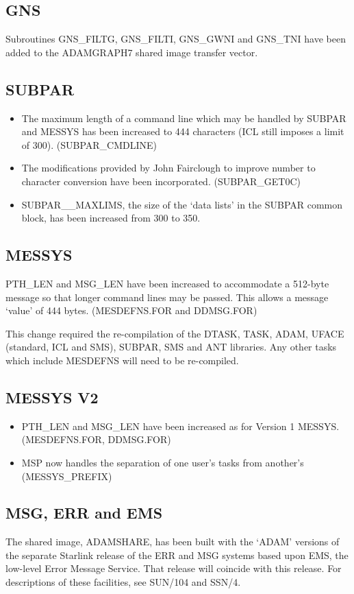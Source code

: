 \subsection{GNS}
Subroutines GNS\_FILTG, GNS\_FILTI, GNS\_GWNI and GNS\_TNI have been added to
the ADAMGRAPH7 shared image transfer vector.

\subsection{SUBPAR}
\begin{itemize}
\item The maximum length of a command line which may be handled by SUBPAR 
and MESSYS has been increased to 444 characters (ICL still imposes a limit 
of 300).
(SUBPAR\_CMDLINE)
\item The modifications provided by John Fairclough to improve number to 
character conversion have been incorporated.
(SUBPAR\_GET0C)
\item SUBPAR\_\_MAXLIMS, the size of the `data lists' in the SUBPAR common
block, has been increased from 300 to 350.
\end{itemize}

\subsection{MESSYS}
PTH\_LEN and MSG\_LEN have been increased to  accommodate a 512-byte message
so that longer command lines may be passed. This allows a message `value'
of 444 bytes.
(MES\-DEFNS\-.FOR and DDMSG\-.FOR) 

This change required the re-compilation of the DTASK, TASK, ADAM, 
UFACE (standard, ICL and SMS), SUBPAR, SMS and ANT libraries. 
Any other tasks which include MESDEFNS will need to be re-compiled.
 
\subsection{MESSYS V2}
\begin{itemize}
\item PTH\_LEN and MSG\_LEN have been increased as for Version 1 MESSYS.
(MESDEFNS.FOR, DDMSG.FOR)
\item MSP now handles the separation of one user's tasks from another's
(MESSYS\_PREFIX)
\end{itemize}

\subsection{MSG, ERR and EMS}
The shared image, ADAMSHARE, has been built with the `ADAM' versions of the
separate Starlink release of the ERR and MSG systems based upon EMS, the
low-level Error Message Service. That release will coincide with this release.
For descriptions of these facilities, see SUN/104 and SSN/4.


